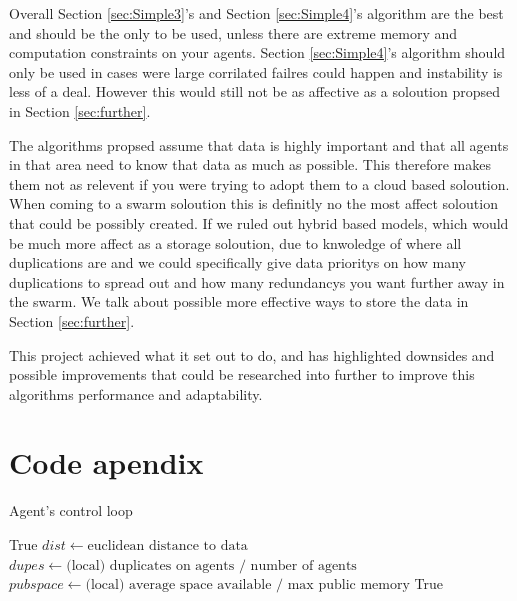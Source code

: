 \documentclass{UoYCSproject}
\begin{document}
Overall Section \ref{sec:Simple3}'s and Section \ref{sec:Simple4}'s algorithm are the best and should be the only to be used, unless there are extreme memory and computation constraints on your agents.
Section \ref{sec:Simple4}'s algorithm should only be used in cases were large corrilated failres could happen and instability is less of a deal.
However this would still not be as affective as a soloution propsed in Section \ref{sec:further}.

The algorithms propsed assume that data is highly important and that all agents in that area need to know that data as much as possible.
This therefore makes them not as relevent if you were trying to adopt them to a cloud based soloution.
When coming to a swarm soloution this is definitly no the most affect soloution that could be possibly created.
If we ruled out hybrid based models, which would be much more affect as a storage soloution, due to knwoledge of where all duplications are and we could specifically give data prioritys on how many duplications to spread out and how many redundancys you want further away in the swarm.
We talk about possible more effective ways to store the data in Section \ref{sec:further}.

This project achieved what it set out to do, and has highlighted downsides and possible improvements that could be researched into further to improve this algorithms performance and adaptability.



\appendix
\chapter{Code apendix}

\begin{algorithm}
\caption{Agent's control loop}
\label{Agent_Control_Loop2}
\begin{algorithmic}[1]
\State {}
\State
{}
\State {}
\State \Return True
\EndIf
\State
\State $dist \gets \text{euclidean distance to data}$
\State $dupes \gets \text{(local) duplicates on agents / number of agents}$
\State $pub space \gets \text{(local) average space available / max public memory}$
\State
{}
\State {}
\EndIf
\State
{}
\State {}
\EndIf
\State
\State {}
\State
\State \Return True
\EndProcedure
\end{algorithmic}
\end{algorithm}
\end{document}
